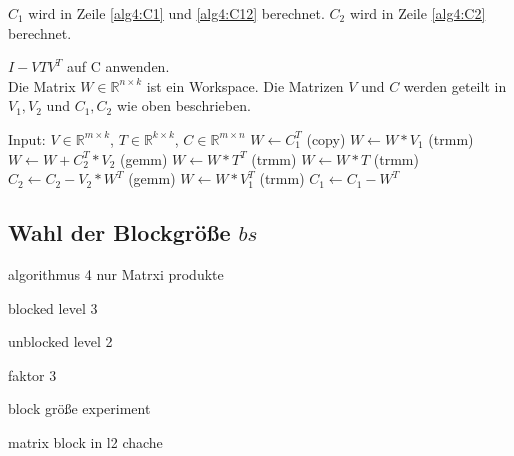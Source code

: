 $C_1$ wird in Zeile \ref{alg4:C1} und \ref{alg4:C12} berechnet. $C_2$ wird in Zeile \ref{alg4:C2} berechnet.



\begin{algorithm}[H]
	\caption{$I - V T V^T$ auf C anwenden.\\
			 Die Matrix $W \in \mathbb{R}^{n \times k}$ ist ein Workspace. Die Matrizen $V$ und $C$ werden geteilt in $V_1, V_2$ und $C_1,C_2$ wie oben beschrieben.}
	\label{alg:applyblockref}
	\begin{algorithmic}[1]
		\State Input: $V \in \mathbb{R}^{m \times k}$, $T \in \mathbb{R}^{k \times k}$, $C \in \mathbb{R}^{m \times n}$
		\State 	$W \leftarrow C_1^T$ (copy) \label{alg4:beg}
		\State	$W \leftarrow W * V_1 $ (trmm)
			\State $W \leftarrow W + C_2^T*V_2$ (gemm)
		\EndIf \label{alg4:end}
		 \label{alg4:trans}
			\State 	$ W \leftarrow W * T^T$ (trmm)
		\Else
			\State 	$  W \leftarrow W * T$ (trmm)
		\EndIf \label{alg4:transE}
			\State $C_2 \leftarrow C_2 - V_2 * W^T$ (gemm) \label{alg4:C2}
		\EndIf
		\State 	$ W \leftarrow W * V_1^T $ (trmm) \label{alg4:C1}
		\State 	$ C_1 \leftarrow C_1 - W^T $ \label{alg4:C12}
	\end{algorithmic}
\end{algorithm}



\subsection{Wahl der Blockgröße $bs$} \label{bs}

algorithmus 4 nur Matrxi produkte

blocked level 3

unblocked level 2

faktor 3

block größe experiment

matrix block in l2 chache


